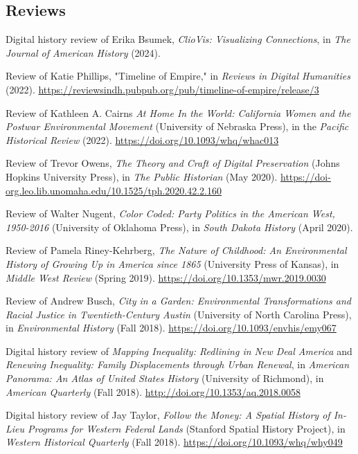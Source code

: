 \documentclass[10pt]{article}
\begin{document}
\subsection{Reviews}

Digital history review of Erika Bsumek, \textit{ClioVis: Visualizing Connections}, in \textit{The Journal of American History} (2024).

Review of Katie Phillips, "Timeline of Empire," in \textit{Reviews in Digital Humanities} (2022). \url{https://reviewsindh.pubpub.org/pub/timeline-of-empire/release/3}

Review of Kathleen A. Cairns \textit{At Home In the World: California Women and the Postwar Environmental Movement} (University of Nebraska Press), in the \textit{Pacific Historical Review} (2022). \url{https://doi.org/10.1093/whq/whac013}

Review of Trevor Owens, \textit{The Theory and Craft of Digital Preservation} (Johns Hopkins University Press), in \textit{The Public Historian} (May 2020). \url{https://doi-org.leo.lib.unomaha.edu/10.1525/tph.2020.42.2.160}

Review of Walter Nugent, \textit{Color Coded: Party Politics in the American West, 1950-2016} (University of Oklahoma Press), in \textit{South Dakota History} (April 2020).

Review of Pamela Riney-Kehrberg, \textit{The Nature of Childhood: An Environmental History of Growing Up in America since 1865} (University Press of Kansas), in \textit{Middle West Review} (Spring 2019). \url{https://doi.org/10.1353/mwr.2019.0030}

Review of Andrew Busch, \textit{City in a Garden: Environmental Transformations and Racial Justice in Twentieth-Century Austin} (University of North Carolina Press), in \textit{Environmental History} (Fall 2018). \url{https://doi.org/10.1093/envhis/emy067}

Digital history review of \textit{Mapping Inequality: Redlining in New Deal America} and \textit{Renewing Inequality: Family Displacements through Urban Renewal}, in \textit{American Panorama: An Atlas of United States History} (University of Richmond), in \textit{American Quarterly} (Fall 2018). \url{http://doi.org/10.1353/aq.2018.0058}

Digital history review of Jay Taylor, \textit{Follow the Money: A Spatial History of In-Lieu Programs for Western Federal Lands} (Stanford Spatial History Project), in \textit{Western Historical Quarterly} (Fall 2018). \url{https://doi.org/10.1093/whq/why049}
\end{document}
